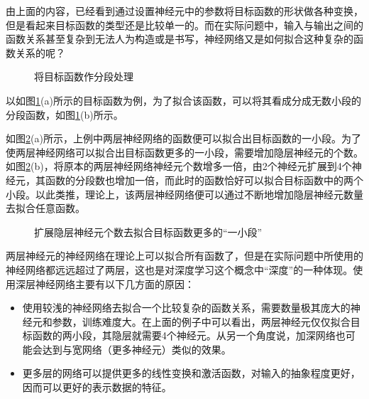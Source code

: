 \parinterval 由上面的内容，已经看到通过设置神经元中的参数将目标函数的形状做各种变换，但是看起来目标函数的类型还是比较单一的。而在实际问题中，输入与输出之间的函数关系甚至复杂到无法人为构造或是书写，神经网络又是如何拟合这种复杂的函数关系的呢？

\begin{figure}[htp]
\centering

\caption{将目标函数作分段处理}
\label{fig:9-23}
\end {figure}

\parinterval 以如图\ref{fig:9-23}(a)所示的目标函数为例，为了拟合该函数，可以将其看成分成无数小段的分段函数，如图\ref{fig:9-23}(b)所示。

\parinterval 如图\ref{fig:9-24}(a)所示，上例中两层神经网络的函数便可以拟合出目标函数的一小段。为了使两层神经网络可以拟合出目标函数更多的一小段，需要增加隐层神经元的个数。如图\ref{fig:9-24}(b)，将原本的两层神经网络神经元个数增多一倍，由2个神经元扩展到4个神经元，其函数的分段数也增加一倍，而此时的函数恰好可以拟合目标函数中的两个小段。以此类推，理论上，该两层神经网络便可以通过不断地增加隐层神经元数量去拟合任意函数。

\begin{figure}[htp]
\centering

\caption{扩展隐层神经元个数去拟合目标函数更多的“一小段”}
\label{fig:9-24}
\end {figure}

\parinterval 两层神经元的神经网络在理论上可以拟合所有函数了，但是在实际问题中所使用的神经网络都远远超过了两层，这也是对深度学习这个概念中“深度”的一种体现。使用深层神经网络主要有以下几方面的原因：

\begin{itemize}
\vspace{0.5em}
\item 使用较浅的神经网络去拟合一个比较复杂的函数关系，需要数量极其庞大的神经元和参数，训练难度大。在上面的例子中可以看出，两层神经元仅仅拟合目标函数的两小段，其隐层就需要4个神经元。从另一个角度说，加深网络也可能会达到与宽网络（更多神经元）类似的效果。
\vspace{0.5em}
\item 更多层的网络可以提供更多的线性变换和激活函数，对输入的抽象程度更好，因而可以更好的表示数据的特征。
\vspace{0.5em}
\end{itemize}

